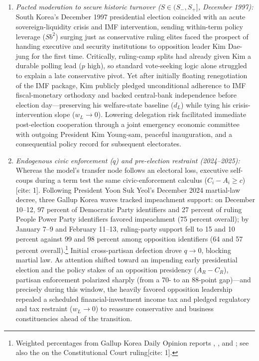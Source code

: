 \begin{enumerate}
\item \emph{Pacted moderation to secure historic turnover ($S\in(S_-,S_+]$, December 1997):} South Korea's December 1997 presidential election coincided with an acute sovereign-liquidity crisis and IMF intervention, sending within-term policy leverage ($Sb^2$) surging just as conservative ruling elites faced the prospect of handing executive and security institutions to opposition leader Kim Dae-jung for the first time. Critically, ruling-camp splits had already given Kim a durable polling lead ($p$ high), so standard vote-seeking logic alone struggled to explain a late conservative pivot. Yet after initially floating renegotiation of the IMF package, Kim publicly pledged unconditional adherence to IMF fiscal-monetary orthodoxy and backed central-bank independence before election day---preserving his welfare-state baseline ($d_L$) while tying his crisis-intervention slope ($w_L\to 0$). Lowering delegation risk facilitated immediate post-election cooperation through a joint emergency economic committee with outgoing President Kim Young-sam, peaceful inauguration, and a consequential policy record for subsequent electorates.
\item \emph{Endogenous civic enforcement ($q$) and pre-election restraint (2024--2025):} Whereas the model's transfer node follows an electoral loss, executive self-coups during a term test the same civic-enforcement calculus ($C_i-A_i\ge c$)[cite: 1]. Following President Yoon Suk Yeol's December 2024 martial-law decree, three Gallup Korea waves tracked impeachment support: on December 10--12, 97 percent of Democratic Party identifiers and 27 percent of ruling People Power Party identifiers favored impeachment (75 percent overall); by January 7--9 and February 11--13, ruling-party support fell to 15 and 10 percent against 99 and 98 percent among opposition identifiers (64 and 57 percent overall).\footnote{Weighted percentages from Gallup Korea Daily Opinion reports , , and ; see also the  on the Constitutional Court ruling[cite: 1].} Initial cross-partisan defection drove $q\to 0$, blocking martial law. As attention shifted toward an impending early presidential election and the policy stakes of an opposition presidency ($A_R-C_R$), partisan enforcement polarized sharply (from a 70- to an 88-point gap)---and precisely during this window, the heavily favored opposition leadership repealed a scheduled financial-investment income tax and pledged regulatory and tax restraint ($w_L\to 0$) to reassure conservative and business constituencies ahead of the transition.

\end{enumerate}
